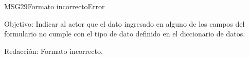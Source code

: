 \begin{mensaje}{MSG29}{Formato incorrecto}{Error}
	\item [Objetivo:] Indicar al actor que el dato ingresado en alguno de los campos del formulario no cumple con el tipo de dato definido en el diccionario de datos.
	\item[Redacción:] Formato incorrecto.
\end{mensaje}
